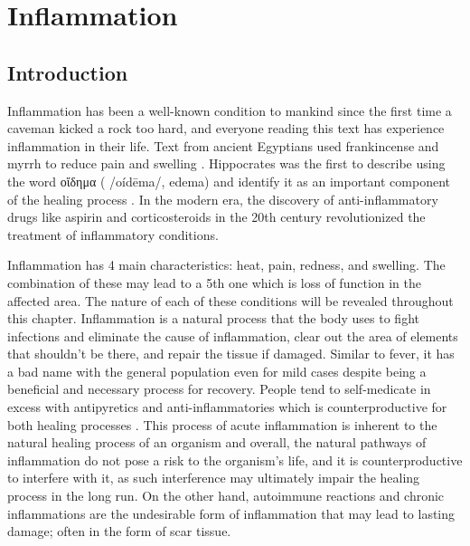 \chapter{Inflammation}
\label{ch:inflammation}

\section{Introduction}

Inflammation has been a well-known condition to mankind since the first time a caveman kicked a rock too hard, and everyone reading this text has experience inflammation in their life. Text from ancient Egyptians used frankincense and myrrh to reduce pain and swelling \cite{Kadioglu2016}. Hippocrates was the first to describe using the word οἴδημα ( /oídēma/, edema) and identify it as an important component of the healing process \cite{Touwaide1999}. In the modern era, the discovery of anti-inflammatory drugs like aspirin and corticosteroids in the 20th century revolutionized the treatment of inflammatory conditions. \cite{Granger2010}


Inflammation has 4 main characteristics: heat, pain, redness, and swelling. The combination of these may lead to a 5th one which is loss of function in the affected area. The nature of each of these conditions will be revealed throughout this chapter. Inflammation is a natural process that the body uses to fight infections and eliminate the cause of inflammation, clear out the area of elements that shouldn't be there, and repair the tissue if damaged. Similar to fever, it has a bad name with the general population even for mild cases despite being a beneficial and necessary process for recovery. People tend to self-medicate in excess with antipyretics and anti-inflammatories which is counterproductive for both healing processes \cite{Serhan2014}. This process of acute inflammation is inherent to the natural healing process of an organism and overall, the natural pathways of inflammation do not pose a risk to the organism's life, and it is counterproductive to interfere with it, as such interference may ultimately impair the healing process in the long run. On the other hand, autoimmune reactions and chronic inflammations are the undesirable form of inflammation that may lead to lasting damage; often in the form of scar tissue.

